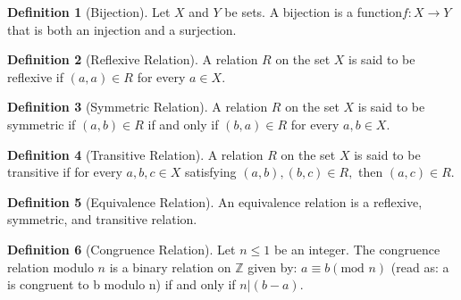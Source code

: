 \documentclass{article}
\theoremstyle{definition}
\newtheorem{define}{Definition}[subsection]
\begin{document}
\begin{define}[Bijection]
Let $X$ and $Y$ be sets. A bijection is a function$ f : X \rightarrow Y$ that is both an injection and a surjection.
\end{define}

\begin{define}[Reflexive Relation]
A relation $R$ on the set $X$ is said to be reflexive if $(a, a) \in R$ for every $a \in X$.
\end{define}

\begin{define}[Symmetric Relation]
A relation $R$ on the set $X$ is said to be symmetric if $(a, b) \in R$ if and only if $(b,a) \in R$ for every $a,b \in X$.
\end{define}

\begin{define}[Transitive Relation]
A relation $R$ on the set $X$ is said to be transitive if for every $a, b, c \in X$ satisfying $(a, b), (b, c) \in R,$ then $(a, c) \in R$.
\end{define}

\begin{define}[Equivalence Relation]
An equivalence relation is a reflexive, symmetric, and transitive relation.
\end{define}

\begin{define}[Congruence Relation]
Let $n \leq 1$ be an integer. The congruence relation modulo $n$ is a binary relation on $\mathbb{Z}$ given by: $a \equiv b (\text{mod }n)$ (read as: a is congruent to b modulo n) if and only if $n|(b-a)$.
\end{define}
\end{document}
